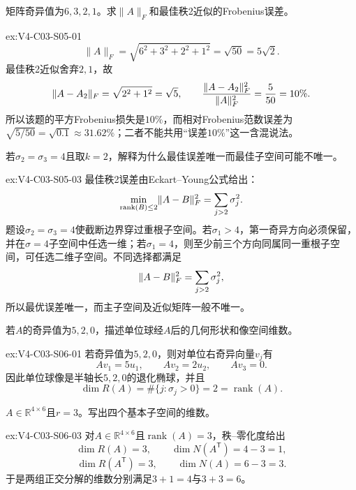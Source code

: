 \begin{SLChapterExercisePairSection}
\begin{exercise}\label{ex:V4-C03-S05-01}
矩阵奇异值为$6,3,2,1$。求$\|A\|_F$和最佳秩2近似的Frobenius误差。
\end{exercise}
\ifSLFullEdition
{}\label{sol:V4-C03-S05-01}
\begin{chapterexercisesolution}{ex:V4-C03-S05-01}
\[
\|A\|_F=\sqrt{6^2+3^2+2^2+1^2}=\sqrt{50}=5\sqrt2.
\]
最佳秩2近似舍弃$2,1$，故
\[
\lVert A-A_2\rVert_F
=\sqrt{2^2+1^2}=\sqrt5,
\qquad
\frac{\lVert A-A_2\rVert_F^2}{\lVert A\rVert_F^2}
=\frac5{50}=10\%.
\]
所以该题的平方Frobenius损失是$10\%$，而相对Frobenius范数误差为
$\sqrt{5/50}=\sqrt{0.1}\approx31.62\%$；二者不能共用“误差$10\%$”这一含混说法。
\end{chapterexercisesolution}
\fi

\begin{exercise}\label{ex:V4-C03-S05-03}
若$\sigma_2=\sigma_3=4$且取$k=2$，解释为什么最佳误差唯一而最佳子空间可能不唯一。
\end{exercise}
\ifSLFullEdition
{}\label{sol:V4-C03-S05-03}
\begin{chapterexercisesolution}{ex:V4-C03-S05-03}
最佳秩2误差由Eckart--Young公式给出：
\[
\min_{\operatorname{rank}(B)\le2}\lVert A-B\rVert_F^2
=\sum_{j>2}\sigma_j^2.
\]
题设$\sigma_2=\sigma_3=4$使截断边界穿过重根子空间。若$\sigma_1>4$，第一奇异方向必须保留，并在$\sigma=4$子空间中任选一维；若$\sigma_1=4$，则至少前三个方向同属同一重根子空间，可任选二维子空间。不同选择都满足
\[
\lVert A-B\rVert_F^2=\sum_{j>2}\sigma_j^2,
\]
所以最优误差唯一，而主子空间及近似矩阵一般不唯一。
\end{chapterexercisesolution}
\fi

\begin{exercise}\label{ex:V4-C03-S06-01}
若$A$的奇异值为$5,2,0$，描述单位球经$A$后的几何形状和像空间维数。
\end{exercise}
\ifSLFullEdition
{}\label{sol:V4-C03-S06-01}
\begin{chapterexercisesolution}{ex:V4-C03-S06-01}
若奇异值为$5,2,0$，则对单位右奇异向量$v_j$有
\[
Av_1=5u_1,
\qquad
Av_2=2u_2,
\qquad
Av_3=0.
\]
因此单位球像是半轴长$5,2,0$的退化椭球，并且
\[
\dim R(A)=\#\{j:\sigma_j>0\}=2
=\operatorname{rank}(A).
\]
\end{chapterexercisesolution}
\fi

\begin{exercise}\label{ex:V4-C03-S06-03}
$A\in\mathbb R^{4\times6}$且$r=3$。写出四个基本子空间的维数。
\end{exercise}
\ifSLFullEdition
{}\label{sol:V4-C03-S06-03}
\begin{chapterexercisesolution}{ex:V4-C03-S06-03}
对$A\in\mathbb R^{4\times6}$且$\operatorname{rank}(A)=3$，秩--零化度给出
\[
\dim R(A)=3,
\qquad
\dim N(A^{\mathsf T})=4-3=1,
\]
\[
\dim R(A^{\mathsf T})=3,
\qquad
\dim N(A)=6-3=3.
\]
于是两组正交分解的维数分别满足$3+1=4$与$3+3=6$。
\end{chapterexercisesolution}
\fi


\end{SLChapterExercisePairSection}
